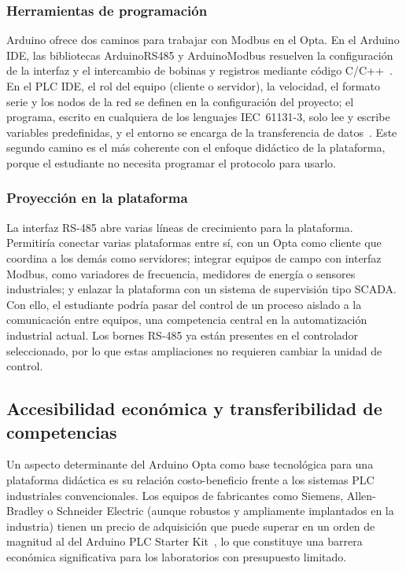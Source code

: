 \documentclass[12pt,a4paper,oneside]{report}
\begin{document}
\subsubsection{Herramientas de programación}

Arduino ofrece dos caminos para trabajar con Modbus en el Opta. En el Arduino IDE, las bibliotecas ArduinoRS485 y ArduinoModbus resuelven la configuración de la interfaz y el intercambio de bobinas y registros mediante código C/C++~\cite{ref29, ref30}. En el PLC IDE, el rol del equipo (cliente o servidor), la velocidad, el formato serie y los nodos de la red se definen en la configuración del proyecto; el programa, escrito en cualquiera de los lenguajes IEC~61131-3, solo lee y escribe variables predefinidas, y el entorno se encarga de la transferencia de datos~\cite{ref33}. Este segundo camino es el más coherente con el enfoque didáctico de la plataforma, porque el estudiante no necesita programar el protocolo para usarlo.

\subsubsection{Proyección en la plataforma}

La interfaz RS-485 abre varias líneas de crecimiento para la plataforma. Permitiría conectar varias plataformas entre sí, con un Opta como cliente que coordina a los demás como servidores; integrar equipos de campo con interfaz Modbus, como variadores de frecuencia, medidores de energía o sensores industriales; y enlazar la plataforma con un sistema de supervisión tipo SCADA. Con ello, el estudiante podría pasar del control de un proceso aislado a la comunicación entre equipos, una competencia central en la automatización industrial actual. Los bornes RS-485 ya están presentes en el controlador seleccionado, por lo que estas ampliaciones no requieren cambiar la unidad de control.

\subsection{Accesibilidad económica y transferibilidad de competencias}

Un aspecto determinante del Arduino Opta como base tecnológica para una plataforma didáctica es su relación costo-beneficio frente a los sistemas PLC industriales convencionales. Los equipos de fabricantes como Siemens, Allen-Bradley o Schneider Electric (aunque robustos y ampliamente implantados en la industria) tienen un precio de adquisición que puede superar en un orden de magnitud al del Arduino PLC Starter Kit~\cite{ref2}, lo que constituye una barrera económica significativa para los laboratorios con presupuesto limitado.
\end{document}
